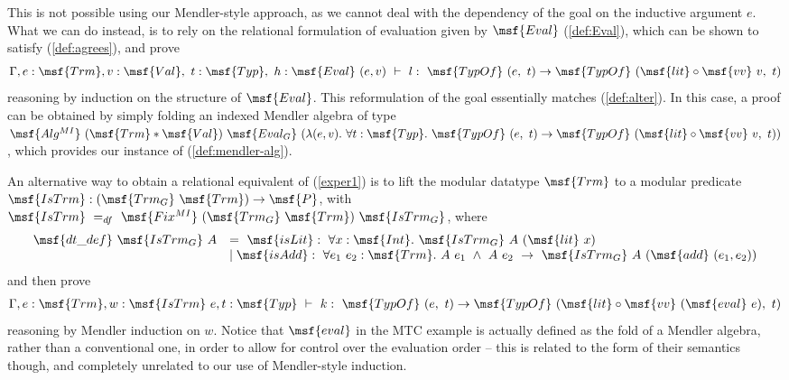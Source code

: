 \documentclass[submission,copyright,creativecommons]{eptcs}
\begin{document}
This is not possible using our Mendler-style approach, as we cannot
deal with the dependency of the goal on the inductive argument $e$.
What we can do instead, is to rely on the relational formulation of
evaluation given by $\msf{Eval}$ (\ref{def:Eval}), which can be shown
to satisfy (\ref{def:agrees}), 
and prove
\begin{gather}  \Gamma, e: \msf{Trm}, v: \msf{Val}, \ t: \msf{Typ}, \ h:
\msf{Eval} \ (e,v) \ \vdash \ l : \ \msf{TypOf} \ (e, \ t) \to
\msf{TypOf} \ (\msf{lit} \circ \msf{vv} \ v, \ t)
\end{gather}
reasoning by induction on the structure of $\msf{Eval}$. This
reformulation of the goal essentially matches (\ref{def:alter}). In
this case, a proof can be obtained by simply folding an indexed
Mendler algebra of type $\msf{Alg^{MI}} \ (\msf{Trm}*\msf{Val})
\ \msf{Eval_G} \ (\lambda (e, v). \ \forall t:\msf{Typ}. \ \msf{TypOf}
\ (e, \ t) \to \msf{TypOf} \ (\msf{lit} \circ \msf{vv} \ v, \ t) ) $,
which provides our instance of (\ref{def:mendler-alg}).

An alternative way to obtain a relational equivalent of (\ref{exper1})
is to lift the modular datatype $\msf{Trm}$ to a modular predicate
$\msf{IsTrm}: (\msf{Trm_G} \ \msf{Trm}) \to \msf{P}$, with
$\msf{IsTrm} \ =_{df} \ \msf{Fix^{MI}} \ (\msf{Trm_G} \ \msf{Trm})
\ \msf{IsTrm_G}$, where
\begin{gather} \label{data-rhoXX2}
\begin{array}{lll}
 \msf{dt\_def} \ \msf{IsTrm_G} \ A & = \ \msf{isLit}: \ \forall
 x:\msf{Int}. \ \msf{IsTrm_G} \ A \ (\msf{lit} \ x) \\
& \mid \msf{isAdd}: \ \forall e_1 \ e_2: \msf{Trm}. \ A \ e_1
 \ \land \ A \ e_2 \ \to \ \msf{IsTrm_G} \ A \ (\msf{add} \ (e_1,e_2))
\end{array}
\end{gather}
and then prove 
\begin{gather}  \label{exper11}
\Gamma, e: \msf{Trm}, w: \msf{IsTrm} \ e, t: \msf{Typ} \ \vdash \ k :
\ \msf{TypOf} \ ( e, \ t) \to \msf{TypOf} \ (\msf{lit} \circ \msf{vv}
\ (\msf{eval} \ e), \ t) \end{gather}
reasoning by Mendler induction on $w$.  Notice that $\msf{eval}$ in
the MTC example \cite{Dela13} is actually defined as the fold of a
Mendler algebra, rather than a conventional one, in order to allow for
control over the evaluation order -- this is related to the form of
their semantics though, and completely unrelated to our use of
Mendler-style induction.
\end{document}
